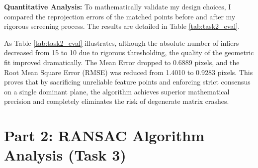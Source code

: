 \documentclass{Resources/UoBLab1}
\begin{document}
    \textbf{Quantitative Analysis:} To mathematically validate my design choices,
    I compared the reprojection errors of the matched points before and after my
    rigorous screening process. The results are detailed in Table
    \ref{tab:task2_eval}.
    \begin{table}[htbp]
        \centering
        \caption{Quantitative Comparison: Baseline vs. Optimized (Task 2)}
        \label{tab:task2_eval}
    \end{table}

    As Table \ref{tab:task2_eval} illustrates, although the absolute number of inliers
    decreased from 15 to 10 due to rigorous thresholding, the quality of the
    geometric fit improved dramatically. The Mean Error dropped to 0.6889 pixels,
    and the Root Mean Square Error (RMSE) was reduced from 1.4010 to 0.9283
    pixels. This proves that by sacrificing unreliable feature points and enforcing
    strict consensus on a single dominant plane, the algorithm achieves superior
    mathematical precision and completely eliminates the risk of degenerate
    matrix crashes.

    \section{Part 2: RANSAC Algorithm Analysis (Task 3)}
\end{document}
